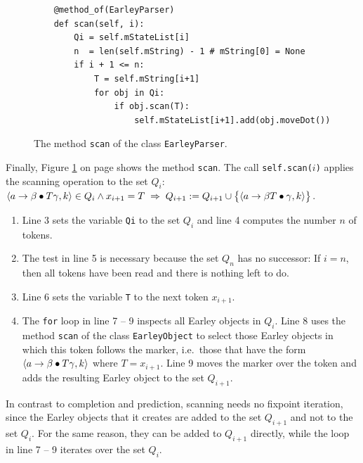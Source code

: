 \begin{figure}[!ht]
\centering
\begin{verbatim}
    @method_of(EarleyParser)
    def scan(self, i):
        Qi = self.mStateList[i]
        n  = len(self.mString) - 1 # mString[0] = None
        if i + 1 <= n:
            T = self.mString[i+1]
            for obj in Qi:
                if obj.scan(T):
                    self.mStateList[i+1].add(obj.moveDot())
\end{verbatim}
\vspace*{-0.3cm}
\caption{The method \texttt{scan} of the class \texttt{EarleyParser}.}
\label{fig:01-Earley-Parser.ipynb:scan}
\end{figure}

\noindent
Finally, Figure \ref{fig:01-Earley-Parser.ipynb:scan} on page \pageref{fig:01-Earley-Parser.ipynb:scan} shows the
method \texttt{scan}.  The call \texttt{self.scan($i$)} applies the scanning operation to the set $Q_i$:
\\[0.2cm]
\hspace*{1.3cm}
$\pair(a \rightarrow \beta \mdot T \gamma, k) \in Q_i \wedge x_{i+1} = T
 \;\Rightarrow\;
 Q_{i+1} := Q_{i+1} \cup \bigl\{ \pair(a \rightarrow \beta T \mdot \gamma, k) \bigr\}$.
\begin{enumerate}
\item Line 3 sets the variable \texttt{Qi} to the set $Q_i$ and line 4 computes the number $n$ of tokens.
\item The test in line 5 is necessary because the set $Q_n$ has no successor:  If $i = n$, then all tokens have
      been read and there is nothing left to do.
\item Line 6 sets the variable \texttt{T} to the next token $x_{i+1}$.
\item The \texttt{for} loop in line 7 -- 9 inspects all Earley objects in $Q_i$.  Line 8 uses the method
      \texttt{scan} of the class \texttt{EarleyObject} to select those Earley objects in which this token follows the
      marker, i.e.~those that have the form $\pair(a \rightarrow \beta \mdot T \gamma, k)$ where $T = x_{i+1}$.
      Line 9 moves the marker over the token and adds the resulting Earley object to the set $Q_{i+1}$.
\end{enumerate}
In contrast to completion and prediction, scanning needs no fixpoint iteration, since the Earley objects that it
creates are added to the set $Q_{i+1}$ and not to the set $Q_i$.  For the same reason, they can be added to $Q_{i+1}$
directly, while the loop in line 7 -- 9 iterates over the set $Q_i$.

